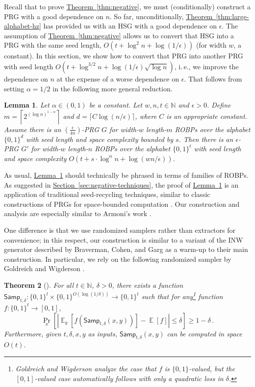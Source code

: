 \documentclass[11pt]{article}
\numberwithin{equation}{section}
\newtheorem{theorem}{Theorem}[section]
\newtheorem{lemma}[theorem]{Lemma}
\theoremstyle{definition}
\theoremstyle{plain}
\newcommand{\N}{\mathbb N}
\newcommand{\ie}{i.\,e.}
\newcommand{\expref}[2]{\hyperref[#2]{#1~\ref{#2}}}
\DeclareMathOperator*{\ExpVal}{\mathbb{E}}
\begin{document}
Recall that to prove \expref{Theorem}{thm:negative}, we must (conditionally) construct a PRG with a good dependence on $n$. So far, unconditionally, \expref{Theorem}{thm:large-alphabet-hz} has provided us with an HSG with a good dependence on $\epsilon$. The assumption of \expref{Theorem}{thm:negative} allows us to convert that HSG into a PRG with the same seed length, $O(t + \log^2 n + \log(1/\epsilon))$ (for width $w$, a constant). In this section, we show how to convert that PRG into another PRG with seed length $O(t + \log^{3/2} n + \log(1/\epsilon) \sqrt{\log n})$, \ie, we improve the dependence on $n$ at the expense of a worse dependence on $\epsilon$. That follows from setting $\alpha = 1/2$ in the following more general reduction.
\begin{lemma} \label{lem:armoni}
Let $\alpha \in (0, 1)$ be a constant. Let $w, n, t \in \N$ and $\epsilon > 0$. Define $m = \left\lceil2^{(\log n)^{1 - \alpha}}\right\rceil$ and $d =  \lceil C\log(n/\epsilon) \rceil$, where $C$ is an appropriate constant. Assume there is an $(\frac{\epsilon}{4n})$-PRG $G$ for width-$w$ length-$m$ ROBPs over the alphabet $\{0, 1\}^d$ with seed length and space complexity bounded by $s$. Then there is an $\epsilon$-PRG $G'$ for width-$w$ length-$n$ ROBPs over the alphabet $\{0, 1\}^t$ with seed length and space complexity $O(t + s \cdot \log^{\alpha} n + \log(wn/\epsilon))$.
\end{lemma}

As usual, \expref{Lemma}{lem:armoni} should technically be phrased in terms of families of ROBPs. As suggested in \expref{Section}{sec:negative-techniques}, the proof of \expref{Lemma}{lem:armoni} is an application of traditional seed-recycling techniques, similar to classic constructions of PRGs for space-bounded computation \cite{Nis92, INW94, NZ96}. Our construction and analysis are especially similar to Armoni's work \cite{Arm98}.

One difference is that we use randomized samplers rather than extractors for convenience; in this respect, our construction is similar to a variant of the INW generator \cite{INW94} described by Braverman, Cohen, and Garg \cite{BCG20} as a warm-up to their main construction. In particular, we rely on the following randomized sampler by Goldreich and Wigderson \cite{GW97}.

\begin{theorem}[{\cite[Lemma 6.6]{GW97}}] \label{thm:gw}
For all $t \in \N$, $\delta > 0$, there exists a function $\mathsf{Samp}_{t, \delta} \colon \{0, 1\}^t \times \{0, 1\}^{O(\log(1/\delta))} \to \{0, 1\}^t$ such that for any\footnote{Goldreich and Wigderson analyze the case that $f$ is $\{0, 1\}$-valued, but the $[0, 1]$-valued case automatically follows with only a quadratic loss in $\delta$.} function $f \colon \{0, 1\}^t \to [0, 1]$,
$$
\Pr_x\left[\left|\ExpVal_y[f(\mathsf{Samp}_{t, \delta}(x, y))] - \ExpVal[f]\right| \leq \delta\right] \geq 1 - \delta\,.
$$
Furthermore, given $t, \delta, x, y$ as inputs, $\mathsf{Samp}_{t, \delta}(x, y)$ can be computed in space $O(t)$.
\end{theorem}
\end{document}
